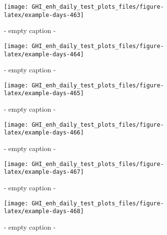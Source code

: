 \documentclass[
  10pt,
  a4paper,oneside]{article}
\begin{document}
\begin{figure}[H]

{\centering \texttt{[image: GHI\_enh\_daily\_test\_plots\_files/figure-latex/example-days-463]} 

}

\caption{ - empty caption - }\label{fig:example-days-463}
\end{figure}

\begin{figure}[H]

{\centering \texttt{[image: GHI\_enh\_daily\_test\_plots\_files/figure-latex/example-days-464]} 

}

\caption{ - empty caption - }\label{fig:example-days-464}
\end{figure}

\begin{figure}[H]

{\centering \texttt{[image: GHI\_enh\_daily\_test\_plots\_files/figure-latex/example-days-465]} 

}

\caption{ - empty caption - }\label{fig:example-days-465}
\end{figure}

\begin{figure}[H]

{\centering \texttt{[image: GHI\_enh\_daily\_test\_plots\_files/figure-latex/example-days-466]} 

}

\caption{ - empty caption - }\label{fig:example-days-466}
\end{figure}

\begin{figure}[H]

{\centering \texttt{[image: GHI\_enh\_daily\_test\_plots\_files/figure-latex/example-days-467]} 

}

\caption{ - empty caption - }\label{fig:example-days-467}
\end{figure}

\begin{figure}[H]

{\centering \texttt{[image: GHI\_enh\_daily\_test\_plots\_files/figure-latex/example-days-468]} 

}

\caption{ - empty caption - }\label{fig:example-days-468}
\end{figure}
\end{document}
